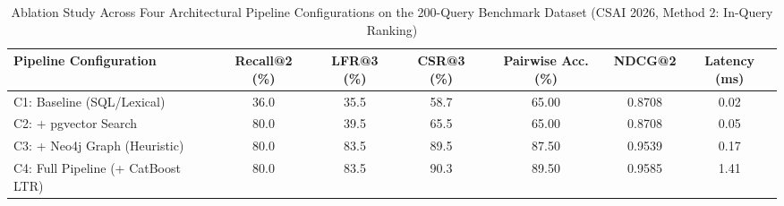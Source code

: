 \begin{table}[t]
\centering
\caption{Ablation Study Across Four Architectural Pipeline Configurations on the 200-Query Benchmark Dataset (CSAI 2026, Method 2: In-Query Ranking)}
\label{tab:ablation_results}
\begin{tabular*}{\textwidth}{@{\extracolsep{\fill}}lcccccc@{}}
\hline
\textbf{Pipeline Configuration} & \textbf{Recall@2 (\%)} & \textbf{LFR@3 (\%)} & \textbf{CSR@3 (\%)} & \textbf{Pairwise Acc. (\%)} & \textbf{NDCG@2} & \textbf{Latency (ms)} \\
\hline
C1: Baseline (SQL/Lexical) & 36.0 & 35.5 & 58.7 & 65.00 & 0.8708 & 0.02 \\
C2: + pgvector Search & 80.0 & 39.5 & 65.5 & 65.00 & 0.8708 & 0.05 \\
C3: + Neo4j Graph (Heuristic) & 80.0 & 83.5 & 89.5 & 87.50 & 0.9539 & 0.17 \\
C4: Full Pipeline (+ CatBoost LTR) & 80.0 & 83.5 & 90.3 & 89.50 & 0.9585 & 1.41 \\
\hline
\end{tabular*}
\end{table}